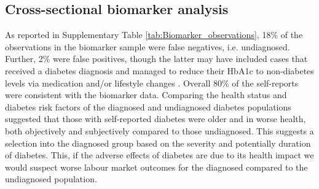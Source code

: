 \documentclass[10pt,letterpaper]{article}
\begin{document}
\FloatBarrier

\subsection*{Cross-sectional biomarker analysis}


As reported in Supplementary Table \ref{tab:Biomarker_observations}, 18\% of the observations in the biomarker sample were false negatives, i.e. undiagnosed. Further, 2\% were false positives, though the latter may have included cases that received a diabetes diagnosis and managed to reduce their \ac{HbA1c} to non-diabetes levels via medication and/or lifestyle changes \cite{Flores-Hernandez2015}. Overall 80\% of the self-reports were consistent with the biomarker data. Comparing the health status and diabetes risk factors of the diagnosed and undiagnosed diabetes populations suggested that those with self-reported diabetes were older and in worse health, both objectively and subjectively compared to those undiagnosed. This suggests a selection into the diagnosed group based on the severity and potentially duration of diabetes. This, if the adverse effects of diabetes are due to its health impact we would suspect worse labour market outcomes for the diagnosed compared to the undiagnosed population.
\end{document}
